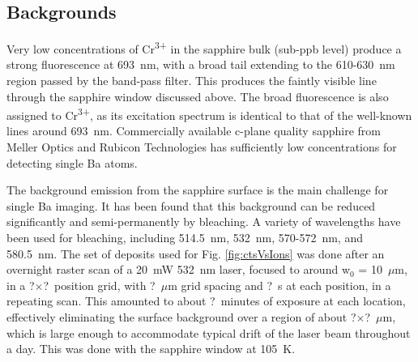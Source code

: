\documentclass[aps,pra,reprint,superscriptaddress]{revtex4-1}
\begin{document}

\subsection{Backgrounds}
\label{sec:backgrounds}

Very low concentrations of Cr\textsuperscript{3+} in the sapphire bulk (sub-ppb level) produce a strong fluorescence at 693~nm, with a broad tail extending to the 610-630~nm region passed by the band-pass filter.  This produces the faintly visible line through the sapphire window discussed above.  The broad fluorescence is also assigned to Cr\textsuperscript{3+}, as its excitation spectrum is identical to that of the well-known lines around 693~nm.  Commercially available c-plane quality sapphire from Meller Optics and Rubicon Technologies has sufficiently low concentrations for detecting single Ba atoms.

The background emission from the sapphire surface is the main challenge for single Ba imaging.  It has been found that this background can be reduced significantly and semi-permanently by bleaching.  A variety of wavelengths have been used for bleaching, including 514.5~nm, 532~nm, 570-572~nm, and 580.5~nm.  The set of deposits used for {\color{gray}Fig. \ref{fig:ctsVsIons}} was done after an overnight raster scan of a 20~mW 532~nm laser, focused to around w$_{0}$ = 10~$\mu$m, in a {\color{gray}?$\times$?}~position grid, with {\color{gray}?}~$\mu$m grid spacing and {\color{gray}?}~s at each position, in a repeating scan.  This amounted to about {\color{gray}?}~minutes of exposure at each location, effectively eliminating the surface background over a region of about {\color{gray}?$\times$?}~$\mu$m, which is large enough to accommodate typical drift of the laser beam throughout a day.  This was done with the sapphire window at 105~K.

\end{document}
